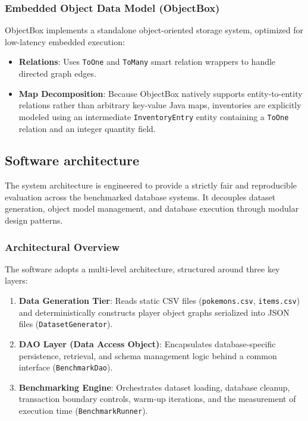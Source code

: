 \documentclass{article}
\begin{document}
\subsubsection{Embedded Object Data Model (ObjectBox)}
ObjectBox implements a standalone object-oriented storage system, optimized for low-latency embedded execution:
\begin{itemize}
    \item \textbf{Relations}: Uses \texttt{ToOne} and \texttt{ToMany} smart relation wrappers to handle directed graph edges.
    \item \textbf{Map Decomposition}: Because ObjectBox natively supports entity-to-entity relations rather than arbitrary key-value Java maps, inventories are explicitly modeled using an intermediate \texttt{InventoryEntry} entity containing a \texttt{ToOne} relation and an integer quantity field.
\end{itemize}

\subsection{Software architecture}
\label{subsec:architecture}
The system architecture is engineered to provide a strictly fair and reproducible evaluation across the benchmarked database systems. It decouples dataset generation, object model management, and database execution through modular design patterns.

\subsubsection{Architectural Overview}
The software adopts a multi-level architecture, structured around three key layers:
\begin{enumerate}
    \item \textbf{Data Generation Tier}: Reads static CSV files (\texttt{pokemons.csv}, \texttt{items.csv}) and deterministically constructs player object graphs serialized into JSON files (\texttt{DatasetGenerator}).
    \item \textbf{DAO Layer (Data Access Object)}: Encapsulates database-specific persistence, retrieval, and schema management logic behind a common interface (\texttt{BenchmarkDao}).
    \item \textbf{Benchmarking Engine}: Orchestrates dataset loading, database cleanup, transaction boundary controls, warm-up iterations, and the measurement of execution time (\texttt{BenchmarkRunner}).
\end{enumerate}
\end{document}
